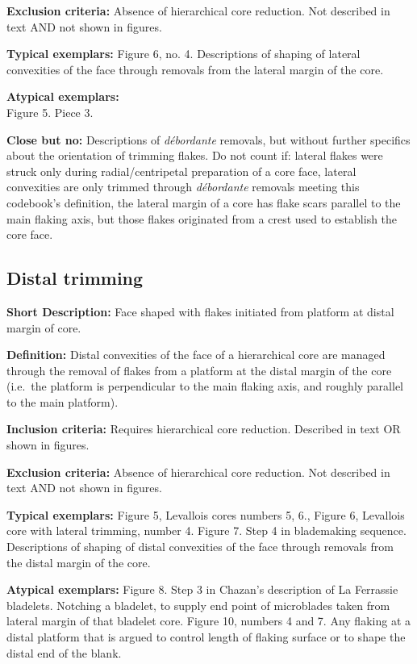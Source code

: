 \documentclass[
]{article}
\begin{document}
\textbf{Exclusion criteria:} Absence of hierarchical core reduction. Not
described in text AND not shown in figures.

\textbf{Typical exemplars:} Figure 6, no. 4. Descriptions of shaping of
lateral convexities of the face through removals from the lateral margin
of the core.

\textbf{Atypical exemplars:}\\
Figure 5. Piece 3.

\textbf{Close but no:} Descriptions of \emph{débordante} removals, but
without further specifics about the orientation of trimming flakes. Do
not count if: lateral flakes were struck only during radial/centripetal
preparation of a core face, lateral convexities are only trimmed through
\emph{débordante} removals meeting this codebook's definition, the
lateral margin of a core has flake scars parallel to the main flaking
axis, but those flakes originated from a crest used to establish the
core face.

\hypertarget{distal-trimming}{%
\subsection{Distal trimming}\label{distal-trimming}}

\textbf{Short Description:} Face shaped with flakes initiated from
platform at distal margin of core.

\textbf{Definition:} Distal convexities of the face of a hierarchical
core are managed through the removal of flakes from a platform at the
distal margin of the core (i.e.~the platform is perpendicular to the
main flaking axis, and roughly parallel to the main platform).

\textbf{Inclusion criteria:} Requires hierarchical core reduction.
Described in text OR shown in figures.

\textbf{Exclusion criteria:} Absence of hierarchical core reduction. Not
described in text AND not shown in figures.

\textbf{Typical exemplars:} Figure 5, Levallois cores numbers 5, 6.,
Figure 6, Levallois core with lateral trimming, number 4. Figure 7. Step
4 in blademaking sequence. Descriptions of shaping of distal convexities
of the face through removals from the distal margin of the core.

\textbf{Atypical exemplars:} Figure 8. Step 3 in Chazan's description of
La Ferrassie bladelets. Notching a bladelet, to supply end point of
microblades taken from lateral margin of that bladelet core. Figure 10,
numbers 4 and 7. Any flaking at a distal platform that is argued to
control length of flaking surface or to shape the distal end of the
blank.
\end{document}
